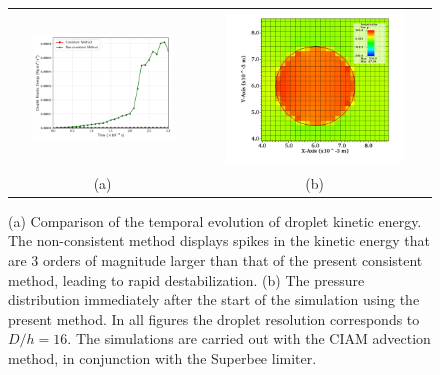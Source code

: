 \begin{figure}
\begin{center}
\begin{tabular}{cc}
\hspace*{-1.0cm}
\includegraphics[width=0.8\textwidth]{plots/raindrop/ke_compare.png} &
\hspace{-0.4cm}%
\includegraphics[width=0.8\textwidth]{plots/raindrop/mc_16ppd_pressure.png}\\
\hspace{-0.8cm}%
(a) & (b)
\end{tabular}
\end{center}
\caption{ (a) Comparison of the temporal evolution of droplet kinetic energy. 
The non-consistent method displays spikes in the kinetic energy that are 3 
orders of magnitude larger than that of the present consistent method, 
leading to rapid destabilization. 
(b) The pressure distribution immediately after the start of the simulation 
using the present method. In all figures the droplet resolution corresponds to $D/h = 16$.
The simulations are carried out with the CIAM advection method, in conjunction with the Superbee limiter.}
\label{pressure_2}
\end{figure}

